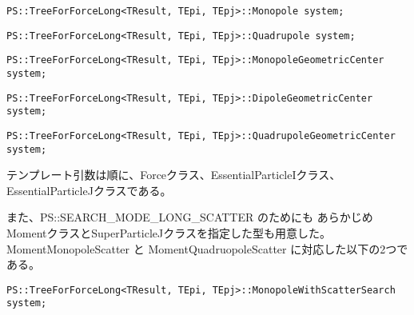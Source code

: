 \begin{screen}
\begin{verbatim}
PS::TreeForForceLong<TResult, TEpi, TEpj>::Monopole system;
\end{verbatim}
\end{screen}


\begin{screen}
\begin{verbatim}
PS::TreeForForceLong<TResult, TEpi, TEpj>::Quadrupole system;
\end{verbatim}
\end{screen}

\begin{screen}
\begin{verbatim}
PS::TreeForForceLong<TResult, TEpi, TEpj>::MonopoleGeometricCenter system;
\end{verbatim}
\end{screen}
\begin{screen}
\begin{verbatim}
PS::TreeForForceLong<TResult, TEpi, TEpj>::DipoleGeometricCenter system;
\end{verbatim}
\end{screen}

\begin{screen}
\begin{verbatim}
PS::TreeForForceLong<TResult, TEpi, TEpj>::QuadrupoleGeometricCenter system;
\end{verbatim}
\end{screen}
テンプレート引数は順に、Forceクラス、EssentialParticleIクラス、
EssentialParticleJクラスである。

また、PS::SEARCH\_MODE\_LONG\_SCATTER のためにも
あらかじめMomentクラスとSuperParticleJクラスを指定した型も用意した。
MomentMonopoleScatter と
MomentQuadruopoleScatter に対応した以下の2つである。

\begin{screen}
\begin{verbatim}
PS::TreeForForceLong<TResult, TEpi, TEpj>::MonopoleWithScatterSearch system;
\end{verbatim}
\end{screen}


